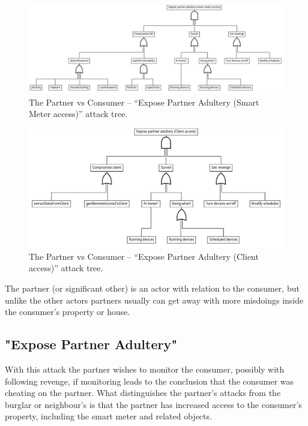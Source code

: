 \begin{figure}[h]
  \includegraphics[angle=90,height=\textheight]{figures/graphviz/partner_vs_consumer_sm.pdf}
  \caption{The Partner vs Consumer -- ``Expose Partner Adultery (Smart Meter access)'' attack tree.}
  \label{fig:attack_trees:partner:cheater_sm}
\end{figure}

\begin{figure}[h]
  \includegraphics[angle=90,height=\textheight]{figures/graphviz/partner_vs_consumer_client.pdf}
  \caption{The Partner vs Consumer -- ``Expose Partner Adultery (Client access)'' attack tree.}
  \label{fig:attack_trees:partner:cheater_client}
\end{figure}

The partner (or significant other) is an actor with relation to the consumer, but unlike the other actors partners usually can get away with more misdoings inside the consumer's property or house.

\subsection{"Expose Partner Adultery"}

With this attack the partner wishes to monitor the consumer, possibly with following revenge, if monitoring leads to the conclusion that the consumer was cheating on the partner.
What distinguishes the partner's attacks from the burglar or neighbour's is that the partner has increased access to the consumer's property, including the smart meter and related objects.


